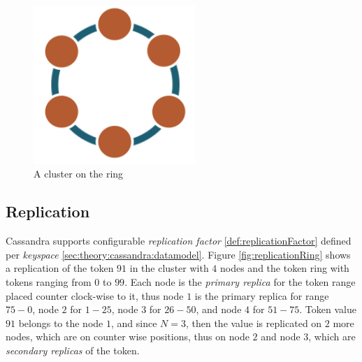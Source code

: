 \begin{figure}[h]
	\centering
	\includegraphics[height=60mm]{images/cassandra-ring.png}\hspace{10mm}
	\caption{A cluster on the ring}
	\label{fig:archCluster}
\end{figure}

\subsection{Replication}
Cassandra supports configurable \emph{replication factor} \ref{def:replicationFactor} defined per \emph{keyspace} \ref{sec:theory:cassandra:datamodel}. Figure \ref{fig:replicationRing} shows a replication of the token $91$ in the cluster with $4$ nodes and the token ring with tokens ranging from $0$ to $99$. 
Each node is the \emph{primary replica} for the token range placed counter clock-wise to it, thus node $1$ is the primary replica for range $75-0$, node $2$ for $1-25$, node $3$ for $26-50$, and node $4$ for $51-75$. 
Token value $91$ belongs to the node $1$, and since $N=3$, then the value is replicated on $2$ more nodes, which are on counter wise positions, thus on node $2$ and node $3$, which are \emph{secondary replicas} of the token. 

